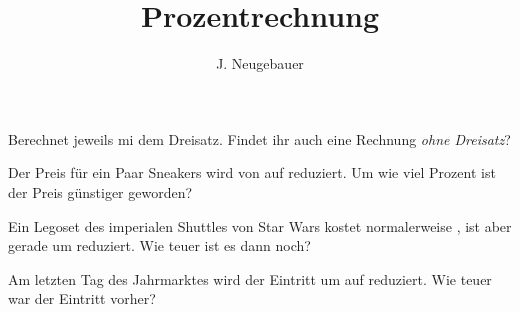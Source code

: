 \documentclass[10pt, a5paper, landscape]{scrartcl}
\author{J. Neugebauer}
\title{Prozentrechnung}
\date{\Heute}
\begin{document}
\TITEL

Berechnet jeweils mi dem Dreisatz. Findet ihr auch eine Rechnung \emph{ohne Dreisatz}?

\begin{aufgabe}[subtitle=Räume: 1 | 4 | 7]
	\label{aufg:prozentsatz}
	Der Preis für ein Paar Sneakers wird von  auf  reduziert. Um wie viel Prozent ist der Preis günstiger geworden?
\end{aufgabe}

\begin{aufgabe}[subtitle=Räume: 2 | 5 | 8]
	\label{aufg:prozentwert}
	Ein Legoset des imperialen Shuttles von Star Wars kostet normalerweise , ist aber gerade um  reduziert. Wie teuer ist es dann noch?
\end{aufgabe}

\begin{aufgabe}[subtitle=Räume: 3 | 6 | 9]
	\label{aufg:grundwert}
	Am letzten Tag des Jahrmarktes wird der Eintritt um  auf  reduziert. Wie teuer war der Eintritt vorher?
\end{aufgabe}
\end{document}
